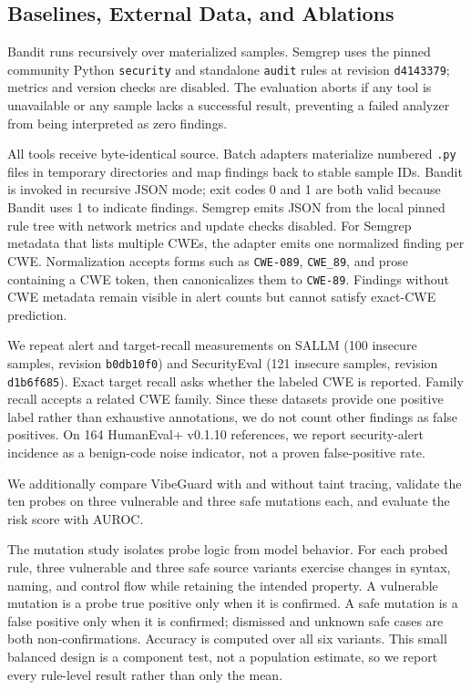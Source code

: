 \documentclass[sigconf,nonacm]{acmart}
\begin{document}
\subsection{Baselines, External Data, and Ablations}

Bandit runs recursively over materialized samples. Semgrep uses the pinned
community Python \texttt{security} and standalone \texttt{audit} rules at
revision \texttt{d4143379}; metrics and version
checks are disabled. The evaluation aborts if any tool is unavailable or any
sample lacks a successful result, preventing a failed analyzer from being
interpreted as zero findings.

All tools receive byte-identical source. Batch adapters materialize numbered
\texttt{.py} files in temporary directories and map findings back to stable
sample IDs. Bandit is invoked in recursive JSON mode; exit codes 0 and 1 are
both valid because Bandit uses 1 to indicate findings. Semgrep emits JSON from
the local pinned rule tree with network metrics and update checks disabled.
For Semgrep metadata that lists multiple CWEs, the adapter emits one normalized
finding per CWE. Normalization accepts forms such as \texttt{CWE-089},
\texttt{CWE\_89}, and prose containing a CWE token, then canonicalizes them to
\texttt{CWE-89}. Findings without CWE metadata remain visible in alert counts
but cannot satisfy exact-CWE prediction.

We repeat alert and target-recall measurements on SALLM (100 insecure samples,
revision \texttt{b0db10f0}) and SecurityEval (121 insecure samples, revision
\texttt{d1b6f685}). Exact target recall asks whether the labeled CWE is
reported. Family recall accepts a related CWE family. Since these datasets
provide one positive label rather than exhaustive annotations, we do not count
other findings as false positives. On 164 HumanEval+ v0.1.10 references, we
report security-alert incidence as a benign-code noise indicator, not a proven
false-positive rate.

We additionally compare VibeGuard with and without taint tracing, validate the
ten probes on three vulnerable and three safe mutations each, and evaluate the
risk score with AUROC.

The mutation study isolates probe logic from model behavior. For each probed
rule, three vulnerable and three safe source variants exercise changes in
syntax, naming, and control flow while retaining the intended property. A
vulnerable mutation is a probe true positive only when it is confirmed. A safe
mutation is a false positive only when it is confirmed; dismissed and unknown
safe cases are both non-confirmations. Accuracy is computed over all six
variants. This small balanced design is a component test, not a population
estimate, so we report every rule-level result rather than only the mean.
\end{document}
